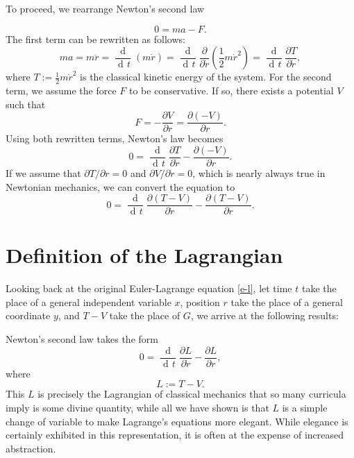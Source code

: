 \documentclass[prb,preprint]{revtex4-1}
\DeclareMathOperator{\dd}{d\!}
\DeclareMathOperator{\ddd}{\mathrm{d}}
\begin{document}
To proceed, we rearrange Newton's second law

\begin{equation}
0 = ma - F.
\end{equation}
The first term can be rewritten as follows:
\begin{equation}
ma = m \ddot{r} = \frac{\ddd}{\dd t} (m \dot{r})
= \frac{\ddd}{\dd t} \frac{\partial}{\partial \dot{r}} \left(\frac{1}{2} m \dot{r}^2 \right)
= \frac{\ddd}{\dd t} \frac{\partial T}{\partial \dot{r}},
\end{equation}
where $T:=\frac{1}{2} m \dot{r}^2$ is the classical kinetic energy of the system. For the second term, we assume the force $F$ to be conservative. If so, there exists a potential $V$ such that
\begin{equation}
F = - \frac{\partial V}{\partial r} = \frac{\partial (-V)}{\partial r}.
\end{equation}
Using both rewritten terms, Newton's law becomes
\begin{equation}
0 = \frac{\ddd}{\dd t} \frac{\partial T}{\partial \dot{r}} - \frac{\partial (-V)}{\partial r}.
\end{equation}
If we assume that $\partial T/ \partial r = 0$ and $\partial V / \partial \dot{r} = 0$, which is nearly always true in Newtonian mechanics, we can convert the equation to
\begin{equation}
0 = \frac{\ddd}{\dd t} \frac{\partial (T-V)}{\partial \dot{r}} - \frac{\partial (T-V)}{\partial r}.
\end{equation}

\section{Definition of the Lagrangian} %

Looking back at the original Euler-Lagrange equation \eqref{e-l}, let time $t$ take the place of a general independent variable $x$, position $r$ take the place of a general coordinate $y$, and $T-V$ take the place of $G$, we arrive at the following results:

Newton's second law takes the form
\begin{equation}
0 = \frac{\ddd}{\dd t} \frac{\partial L}{\partial \dot{r}} - \frac{\partial L}{\partial r},
\end{equation}
where
\begin{equation}
 L := T-V.
\end{equation}
This $L$ is precisely the Lagrangian of classical mechanics that so many curricula imply is some divine quantity, while all we have shown is that $L$ is a simple change of variable to make Lagrange's equations more elegant. While elegance is certainly exhibited in this representation, it is often at the expense of increased abstraction.
\end{document}
